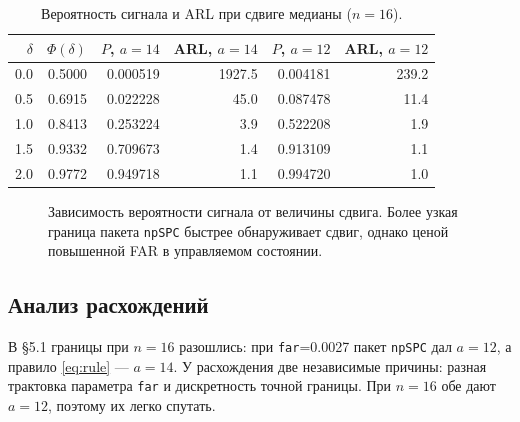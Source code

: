\documentclass[11pt,a4paper]{article}
\newcommand{\SN}{\mathrm{SN}}
\def\verOCBook{(0.0,0.000519) (0.25,0.003207) (0.5,0.022228) (0.75,0.093159) (1.0,0.253224) (1.25,0.484208) (1.5,0.709673) (1.75,0.867017) (2.0,0.949718)}
\def\verOCNp{(0.0,0.004181) (0.25,0.018020) (0.5,0.087478) (0.75,0.261912) (1.0,0.522208) (1.25,0.764768) (1.5,0.913109) (1.75,0.975662) (2.0,0.994720)}
\begin{document}
\begin{table}[htbp]\centering
\caption{Вероятность сигнала и ARL при сдвиге медианы ($n=16$).}
\label{tab:oc}
\begin{tabular}{@{}r r r r r r@{}}
\toprule
$\delta$ & $\Phi(\delta)$ & $P$, $a=14$ & ARL, $a=14$
& $P$, $a=12$ & ARL, $a=12$ \\
\midrule
0.0 & 0.5000 & 0.000519 & 1927.5 & 0.004181 & 239.2 \\
0.5 & 0.6915 & 0.022228 &   45.0 & 0.087478 &  11.4 \\
1.0 & 0.8413 & 0.253224 &    3.9 & 0.522208 &   1.9 \\
1.5 & 0.9332 & 0.709673 &    1.4 & 0.913109 &   1.1 \\
2.0 & 0.9772 & 0.949718 &    1.1 & 0.994720 &   1.0 \\
\bottomrule
\end{tabular}
\end{table}

\begin{figure}[htbp]\centering
{}
\caption{Зависимость вероятности сигнала от величины сдвига. Более узкая
граница пакета \texttt{npSPC} быстрее обнаруживает сдвиг, однако ценой
повышенной FAR в управляемом состоянии.}
\label{fig:oc}
\end{figure}

\subsection{Анализ расхождений}
\label{sec:disc}

В §5.1 границы при $n=16$ разошлись: при \texttt{far}=0.0027 пакет
\texttt{npSPC} дал $a=12$, а правило \eqref{eq:rule} --- $a=14$. У
расхождения две независимые причины: разная трактовка параметра
\texttt{far} и дискретность точной границы. При $n=16$ обе дают $a=12$,
поэтому их легко спутать.
\end{document}
